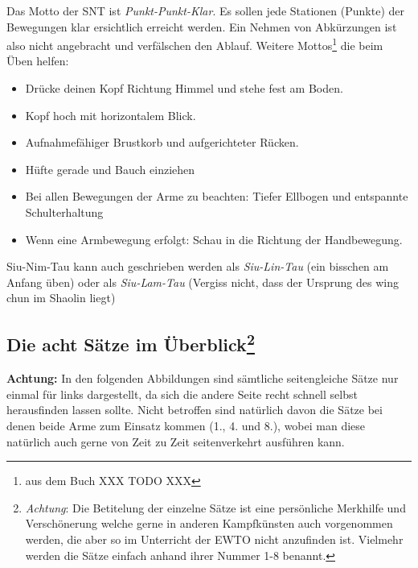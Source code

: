 Das Motto der SNT ist \textit{Punkt-Punkt-Klar}. Es sollen jede Stationen (Punkte) der Bewegungen klar ersichtlich erreicht werden. Ein Nehmen von Abk\"urzungen ist also nicht angebracht und verf\"alschen den Ablauf. Weitere Mottos\footnote{aus dem Buch XXX TODO XXX} die beim \"Uben helfen:

\begin{itemize}
	\item Dr\"ucke deinen Kopf Richtung Himmel und stehe fest am Boden.
	\item Kopf hoch mit horizontalem Blick.
	\item Aufnahmef\"ahiger Brustkorb und aufgerichteter R\"ucken.
	\item H\"ufte gerade und Bauch einziehen
	\item Bei allen Bewegungen der Arme zu beachten: Tiefer Ellbogen und entspannte Schulterhaltung
	\item Wenn eine Armbewegung erfolgt: Schau in die Richtung der Handbewegung.
\end{itemize}

\begin{WTCommonBegriff}
	Siu-Nim-Tau kann auch geschrieben werden als \textit{Siu-Lin-Tau} (ein bisschen am Anfang \"uben) oder als \textit{Siu-Lam-Tau} (Vergiss nicht, dass der Ursprung des wing chun im Shaolin liegt)
\end{WTCommonBegriff}

\subsection*{Die acht S\"atze im \"Uberblick\footnote{\textit{Achtung}: Die Betitelung der einzelne S\"atze ist eine pers\"onliche Merkhilfe und Versch\"onerung welche gerne in anderen Kampfk\"unsten auch vorgenommen werden, die aber so im Unterricht der EWTO nicht anzufinden ist. Vielmehr werden die S\"atze einfach anhand ihrer Nummer 1-8 benannt.}}


\textbf{Achtung: } In den folgenden Abbildungen sind s\"amtliche seitengleiche S\"atze nur einmal f\"ur links dargestellt, da sich die andere Seite recht schnell selbst herausfinden lassen sollte. Nicht betroffen sind nat\"urlich davon die S\"atze bei denen beide Arme zum Einsatz kommen (1., 4. und 8.), wobei man diese nat\"urlich auch gerne von Zeit zu Zeit seitenverkehrt ausf\"uhren kann.


